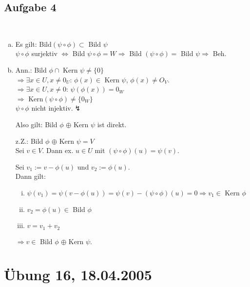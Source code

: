 \documentclass[a4paper,twoside,DIV15,BCOR12mm]{scrbook}
\newcommand{\enur}{\ \begin{enumerate}[(i)]}
\newcommand{\enua}{\ \begin{enumerate}[a)]}
\newcommand{\une}{\end{enumerate}}
\newcommand{\RA}{\Rightarrow}
\newcommand{\LRA}{\Leftrightarrow}
\newcommand{\error}{\lightning}
\begin{document}
\subsection {Aufgabe 4}
\enua
\item
Es gilt: Bild$(\psi\circ\phi)\subset$ Bild $\psi$\\
$\psi\circ\phi$ surjektiv $\LRA$ Bild $\psi\circ\phi=W\RA$ Bild $(\psi\circ\phi)=$ Bild $\psi\RA$ Beh.
\item
Ann.: Bild $\phi\cap$ Kern $\psi\neq\{0\}$\\
$\RA\exists x\in U, x\neq 0_U$: $\phi(x)\in$ Kern $\psi$, $\phi(x)\neq O_V$.\\
$\RA\exists x\in U, x\neq 0$: $\psi(\phi(x))=0_W$\\
$\RA$ Kern$(\psi\circ\phi)\neq\{0_W\}$\\
$\psi\circ\phi$ nicht injektiv.$\error$\par
Also gilt: Bild $\phi$ $\oplus$ Kern $\psi$ ist direkt.\par
z.Z.: Bild $\phi$ $\oplus$ Kern $\psi=V$\\
Sei $v\in V$. Dann ex. $u\in U$ mit $(\psi\circ\phi)(u)=\psi(v)$.\par
Sei $v_1:=v-\phi(u)$ und $v_2:=\phi(u)$.\\
Dann gilt:
\enur
\item $\psi(v_1)=\psi(v-\phi(u))=\psi(v)-(\psi\circ\phi)(u)=0\RA v_1\in$ Kern $\phi$
\item $v_2=\phi(u)\in$ Bild $\phi$
\item $v=v_1+v_2$
\une
$\RA v\in$ Bild $\phi$ $\oplus$ Kern $\psi$.
\une


\section {Übung 16, 18.04.2005}
\end{document}
